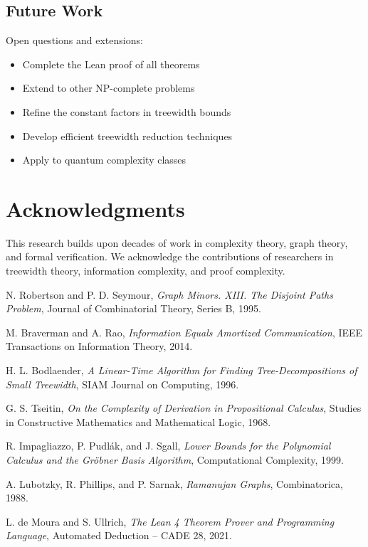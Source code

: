\documentclass[11pt]{article}
\begin{document}
\subsection{Future Work}

Open questions and extensions:
\begin{itemize}
\item Complete the Lean proof of all theorems
\item Extend to other NP-complete problems
\item Refine the constant factors in treewidth bounds
\item Develop efficient treewidth reduction techniques
\item Apply to quantum complexity classes
\end{itemize}

\section*{Acknowledgments}

This research builds upon decades of work in complexity theory, graph theory, and formal verification. We acknowledge the contributions of researchers in treewidth theory, information complexity, and proof complexity.


\begin{thebibliography}{99}

N. Robertson and P. D. Seymour,
\emph{Graph Minors. XIII. The Disjoint Paths Problem},
Journal of Combinatorial Theory, Series B, 1995.

M. Braverman and A. Rao,
\emph{Information Equals Amortized Communication},
IEEE Transactions on Information Theory, 2014.

H. L. Bodlaender,
\emph{A Linear-Time Algorithm for Finding Tree-Decompositions of Small Treewidth},
SIAM Journal on Computing, 1996.

G. S. Tseitin,
\emph{On the Complexity of Derivation in Propositional Calculus},
Studies in Constructive Mathematics and Mathematical Logic, 1968.

R. Impagliazzo, P. Pudlák, and J. Sgall,
\emph{Lower Bounds for the Polynomial Calculus and the Gröbner Basis Algorithm},
Computational Complexity, 1999.

A. Lubotzky, R. Phillips, and P. Sarnak,
\emph{Ramanujan Graphs},
Combinatorica, 1988.

L. de Moura and S. Ullrich,
\emph{The Lean 4 Theorem Prover and Programming Language},
Automated Deduction -- CADE 28, 2021.

\end{thebibliography}
\end{document}

